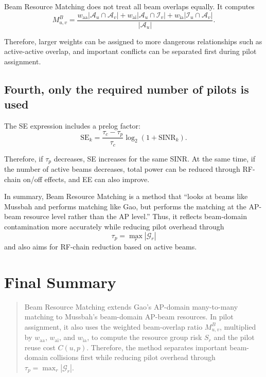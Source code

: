 \documentclass[11pt,a4paper]{article}
\newcommand{\waa}{w_{\mathrm{aa}}}
\newcommand{\wai}{w_{\mathrm{ai}}}
\newcommand{\wia}{w_{\mathrm{ia}}}
\begin{document}
Beam Resource Matching does not treat all beam overlaps equally. It computes
\[
    M_{u,v}^{B}
    =
    \frac{
        \waa|\mathcal{A}_u\cap\mathcal{A}_v|
        +
        \wai|\mathcal{A}_u\cap\mathcal{I}_v|
        +
        \wia|\mathcal{I}_u\cap\mathcal{A}_v|
    }{|\mathcal{A}_u|}.
\]

Therefore, larger weights can be assigned to more dangerous relationships such as active-active overlap, and important conflicts can be separated first during pilot assignment.

\subsection*{Fourth, only the required number of pilots is used}

The SE expression includes a prelog factor:
\[
    \mathrm{SE}_k
    =
    \frac{\tau_c-\tau_p}{\tau_c}
    \log_2(1+\mathrm{SINR}_k).
\]

Therefore, if \(\tau_p\) decreases, SE increases for the same SINR. At the same time, if the number of active beams decreases, total power can be reduced through RF-chain on/off effects, and EE can also improve.

In summary, Beam Resource Matching is a method that ``looks at beams like Mussbah and performs matching like Gao, but performs the matching at the AP-beam resource level rather than the AP level.'' Thus, it reflects beam-domain contamination more accurately while reducing pilot overhead through
\[
    \tau_p=\max_{r}|\mathcal{G}_r|
\]
and also aims for RF-chain reduction based on active beams.

\section{Final Summary}

\begin{quote}
Beam Resource Matching extends Gao's AP-domain many-to-many matching to Mussbah's beam-domain AP-beam resources. In pilot assignment, it also uses the weighted beam-overlap ratio \(M_{u,v}^{B}\), multiplied by \(\waa\), \(\wai\), and \(\wia\), to compute the resource group risk \(S_r\) and the pilot reuse cost \(C(u,p)\). Therefore, the method separates important beam-domain collisions first while reducing pilot overhead through \(\tau_p=\max_r|\mathcal{G}_r|\).
\end{quote}
\end{document}
